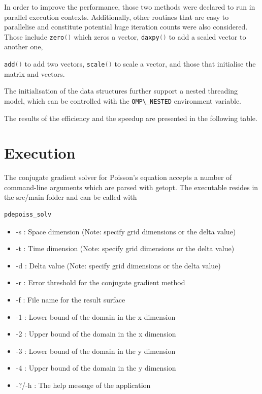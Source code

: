 \documentclass[12pt,a4paper]{report}
\def\ccode#1{
  \lstinline[basicstyle=\ttfamily,language=C]{#1} }
\begin{document}
In order to improve the performance, those two methods were declared
to run in parallel execution contexts. Additionally, other routines
that are easy to parallelise and constitute potential huge iteration
counts were also considered. Those include \ccode{zero()} which
zeros a vector, \ccode{daxpy()} to add a scaled vector to another one,
\ccode{add()} to add two vectors, \ccode{scale()} to scale a vector,
and those that initialise the matrix and vectors.

The initialisation of the data structures further support a nested
threading model, which can be controlled with the \verb=OMP\_NESTED=
environment variable.

The results of the efficiency and the speedup are presented in the
following table.


\chapter{Execution}
\label{cha:execution}

The conjugate gradient solver for Poisson's equation accepts a number
of command-line arguments which are parsed with getopt. The executable
resides in the src/main folder and can be
called with \begin{verbatim}pdepoiss_solv\end{verbatim}

\begin{itemize}
\item -s : Space dimension (Note: specify grid dimensions or the delta
  value)
\item -t : Time dimension (Note: specify grid dimensions or the delta
  value)
\item -d : Delta value (Note: specify grid dimensions or the delta
  value)
\item -r : Error threshold for the conjugate gradient method
\item -f : File name for the result surface
\item -1 : Lower bound of the domain in the x dimension
\item -2 : Upper bound of the domain in the x dimension
\item -3 : Lower bound of the domain in the y dimension
\item -4 : Upper bound of the domain in the y dimension
\item -?/-h : The help message of the application
\end{itemize}
\end{document}
